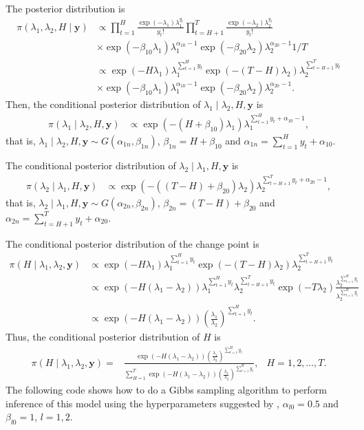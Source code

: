The posterior distribution is
\begin{align*}
	\pi(\lambda_1,\lambda_2,H\mid \bm{y})&\propto \prod_{t=1}^{H} \frac{\exp(-\lambda_1)\lambda_1^{y_t}}{y_t!} \prod_{t=H+1}^{T}\frac{\exp(-\lambda_2)\lambda_2^{y_t}}{y_t!}\\
	&\times \exp(-\beta_{10}\lambda_1)\lambda_1^{\alpha_{10}-1} \exp(-\beta_{20}\lambda_2)\lambda_2^{\alpha_{20}-1} 1/T\\
	&\propto\exp(-H\lambda_1)\lambda_1^{\sum_{t=1}^H y_t}\exp(-(T-H)\lambda_2)\lambda_2^{\sum_{t=H+1}^T y_t}\\
	&\times \exp(-\beta_{10}\lambda_1)\lambda_1^{\alpha_{10}-1} \exp(-\beta_{20}\lambda_2)\lambda_2^{\alpha_{20}-1}.
\end{align*} 
Then, the conditional posterior distribution of $\lambda_1\mid \lambda_2,H,\bm{y}$ is 
\begin{align*}
	\pi(\lambda_1\mid \lambda_2,H,\bm{y})&\propto\exp(-(H+\beta_{10})\lambda_1)\lambda_1^{\sum_{t=1}^H y_t+\alpha_{10}-1},
\end{align*} 
that is, $\lambda_1\mid \lambda_2,H,\bm{y}\sim G(\alpha_{1n},\beta_{1n})$, $\beta_{1n}=H+\beta_{10}$ and $\alpha_{1n}=\sum_{t=1}^H y_t+\alpha_{10}$.

The conditional posterior distribution of $\lambda_2\mid \lambda_1,H,\bm{y}$ is 
\begin{align*}
	\pi(\lambda_2\mid \lambda_1,H,\bm{y})&\propto\exp(-((T-H)+\beta_{20})\lambda_2)\lambda_2^{\sum_{t=H+1}^T y_t+\alpha_{20}-1},
\end{align*} 
that is, $\lambda_2\mid \lambda_1,H,\bm{y}\sim G(\alpha_{2n},\beta_{2n})$, $\beta_{2n}=(T-H)+\beta_{20}$ and $\alpha_{2n}=\sum_{t=H+1}^T y_t+\alpha_{20}$.

The conditional posterior distribution of the change point is
\begin{align*}
	\pi(H\mid \lambda_1,\lambda_2,\bm{y})&\propto\exp(-H\lambda_1)\lambda_1^{\sum_{t=1}^H y_t}\exp(-(T-H)\lambda_2)\lambda_2^{\sum_{t=H+1}^T y_t}\\
	&\propto \exp(-H(\lambda_1-\lambda_2))\lambda_1^{\sum_{t=1}^H y_t}\lambda_2^{\sum_{t=H+1}^T y_t} \exp(-T\lambda_2) \frac{\lambda_2^{\sum_{t=1}^H y_t}}{\lambda_2^{\sum_{t=1}^H y_t}}\\
	&\propto \exp(-H(\lambda_1-\lambda_2))\left(\frac{\lambda_1}{\lambda_2}\right)^{\sum_{t=1}^H y_t}.
\end{align*} 
Thus, the conditional posterior distribution of $H$ is
\begin{align*}
	\pi(H\mid \lambda_1,\lambda_2,\bm{y})=& \frac{\exp(-H(\lambda_1-\lambda_2))\left(\frac{\lambda_1}{\lambda_2}\right)^{\sum_{t=1}^H y_t}}{\sum_{H=1}^T \exp(-H(\lambda_1-\lambda_2))\left(\frac{\lambda_1}{\lambda_2}\right)^{\sum_{t=1}^H y_t}}, & H=1,2,\dots,T.
\end{align*}
The following code shows how to do a Gibbs sampling algorithm to perform inference of this model using the hyperparameters suggested by \cite[Chap.~7]{greenberg2012introduction}, $\alpha_{l0}=0.5$ and $\beta_{l0}=1$, $l=1,2$.

